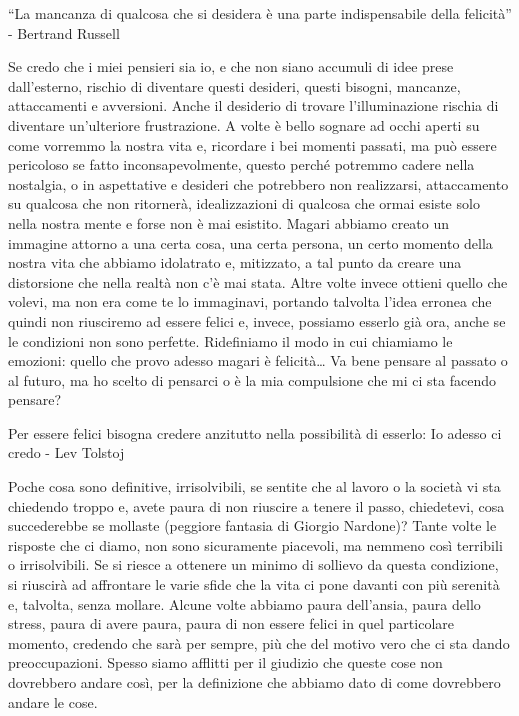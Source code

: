 \documentclass[12pt]{book} %
\begin{document}
“La mancanza di qualcosa che si desidera è una parte indispensabile della felicità” - Bertrand Russell

Se credo che i miei pensieri sia io, e che non siano accumuli di idee prese dall'esterno, rischio di diventare questi desideri, questi bisogni, mancanze, attaccamenti e avversioni. Anche il desiderio di trovare l'illuminazione rischia di diventare un'ulteriore frustrazione. A volte è bello sognare ad occhi aperti su come vorremmo la nostra vita e, ricordare i bei momenti passati, ma può essere
pericoloso se fatto inconsapevolmente, questo perché potremmo cadere nella nostalgia, o in aspettative e desideri che potrebbero non realizzarsi, attaccamento su qualcosa che non ritornerà, idealizzazioni di qualcosa che ormai esiste solo nella nostra mente e forse non è mai esistito. Magari abbiamo creato un immagine attorno a una certa cosa, una certa persona, un certo momento della nostra
vita che abbiamo idolatrato e, mitizzato, a tal punto da creare una distorsione che nella realtà non c'è mai stata.
Altre volte invece ottieni quello che volevi, ma non era come te lo immaginavi, portando talvolta l'idea erronea che quindi non riusciremo ad essere felici e, invece, possiamo esserlo già ora, anche se le condizioni non sono perfette. Ridefiniamo il modo in cui chiamiamo le emozioni:
quello che provo adesso magari è felicità…
Va bene pensare al passato o al futuro, ma ho scelto di pensarci o è la mia compulsione che mi ci sta facendo pensare?

Per essere felici bisogna credere anzitutto nella possibilità di esserlo: Io adesso ci credo - Lev Tolstoj 

Poche cosa sono definitive, irrisolvibili, se sentite che al lavoro o la società
vi sta chiedendo troppo e, avete paura di non riuscire a tenere il passo, chiedetevi, cosa succederebbe se mollaste (peggiore fantasia di Giorgio Nardone)?
Tante volte le risposte che ci diamo, non sono sicuramente piacevoli, ma nemmeno così terribili o irrisolvibili. Se si riesce a ottenere un minimo di sollievo da questa condizione, si riuscirà ad affrontare le varie sfide che la vita ci pone davanti con più serenità e, talvolta, senza mollare. Alcune volte abbiamo paura dell'ansia, paura dello stress, paura di avere paura, paura di non essere felici in quel particolare momento, credendo che sarà per sempre, più che del motivo vero che ci sta dando preoccupazioni. Spesso siamo afflitti per il giudizio che queste cose non dovrebbero andare così, per la definizione che abbiamo dato di come dovrebbero andare le cose.
\end{document}
